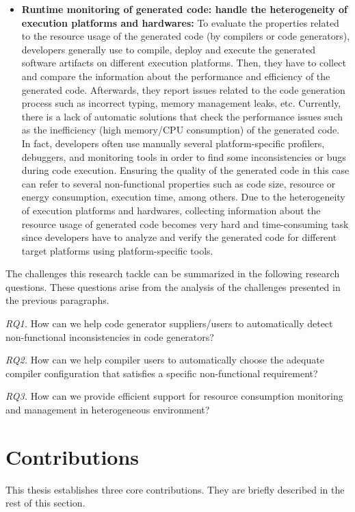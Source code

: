 \begin{itemize}
\item
\textbf{Runtime monitoring of generated code: handle the heterogeneity of execution platforms and hardwares:} To evaluate the properties related to the resource usage of the generated code (by compilers or code generators), developers generally use to compile, deploy and execute the generated software artifacts on different execution platforms. Then, they have to collect and compare the information about the performance and efficiency of the generated code. Afterwards, they report issues related to the code generation process such as incorrect typing, memory management leaks, etc.
Currently, there is a lack of automatic solutions that check the performance issues such as the inefficiency (high memory/CPU consumption) of the generated code. In fact, developers often use manually several platform-specific profilers, debuggers, and monitoring tools\cite{guana2014chaintracker,delgado2004taxonomy} in order to find some inconsistencies or bugs during code execution. Ensuring the quality of the generated code in this case can refer to several non-functional properties such as code size, resource or energy consumption, execution time, among others\cite{pan2006fast}. Due to the heterogeneity of execution platforms and hardwares, collecting information about the resource usage of generated code becomes very hard and time-consuming task since developers have to analyze and verify the generated code for different target platforms using platform-specific tools. 


\end{itemize}
The challenges this research tackle can be summarized in the following research questions. These questions arise from the analysis of the challenges presented in the previous paragraphs.

\textit{RQ1.} How can we help code generator suppliers/users to automatically detect non-functional inconsistencies in code generators?

\textit{RQ2.} How can we help compiler users to automatically choose the adequate compiler configuration that satisfies a specific non-functional requirement?

\textit{RQ3.} How can we provide efficient support for resource consumption monitoring and management in heterogeneous environment?


\section{Contributions}
This thesis establishes three core contributions. They are briefly described in the rest of this section.


